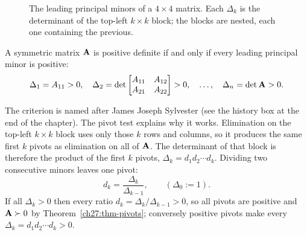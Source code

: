 \begin{figure}[htbp]
\centering
{}
\caption{The leading principal minors of a $4\times 4$ matrix. Each $\Delta_k$ is the determinant
of the top-left $k\times k$ block; the blocks are nested, each one containing the previous.}
\label{ch27:fig-minors}
\end{figure}

\begin{theorem}
\label{ch27:thm-sylvester}
A symmetric matrix $\mathbf{A}$ is positive definite if and only if every leading principal minor is
positive:
\[
  \Delta_1 = A_{11} > 0,\quad
  \Delta_2 = \det\begin{bmatrix} A_{11} & A_{12} \\ A_{21} & A_{22}\end{bmatrix} > 0,\quad
  \dots,\quad
  \Delta_n = \det\mathbf{A} > 0.
\]
\end{theorem}

The criterion is named after James Joseph Sylvester (see the history box at the end of the chapter).
The pivot test explains why it works. Elimination on the top-left $k\times k$ block uses only those
$k$ rows and columns, so it produces the same first $k$ pivots as elimination on all of $\mathbf{A}$.
The determinant of that block is therefore the product of the first $k$ pivots, $\Delta_k = d_1 d_2
\cdots d_k$. Dividing two consecutive minors leaves one pivot:
\[
  d_k = \frac{\Delta_k}{\Delta_{k-1}}, \qquad (\Delta_0 := 1).
\]
If all $\Delta_k > 0$ then every ratio $d_k = \Delta_k/\Delta_{k-1} > 0$, so all pivots are
positive and $\mathbf{A}\succ 0$ by Theorem~\ref{ch27:thm-pivots}; conversely positive pivots make
every $\Delta_k = d_1 d_2\cdots d_k > 0$.

